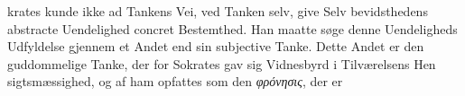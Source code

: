 \documentclass[12pt,a4paper]{book}
\newcommand{\gk}[1]{\textit{#1}}
\begin{document}
krates kunde ikke ad Tankens Vei, ved Tanken selv, give Selv\-%
bevidsthedens abstracte Uendelighed concret Bestemthed. Han
maatte søge denne Uendeligheds Udfyldelse gjennem et Andet
end sin subjective Tanke. Dette Andet er den guddommelige
Tanke, der for Sokrates gav sig Vidnesbyrd i Tilværelsens Hen\-%
sigtsmæssighed, og af ham opfattes som den \gk{φρόνησις}, der er
\end{document}
